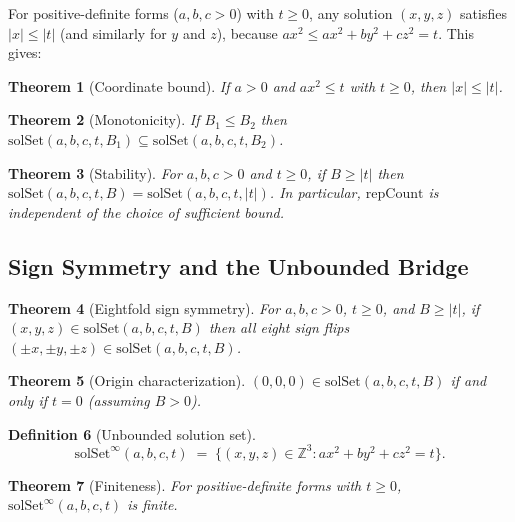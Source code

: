 \documentclass[11pt,a4paper]{article}
\newtheorem{theorem}{Theorem}[section]
\theoremstyle{definition}
\newtheorem{definition}[theorem]{Definition}
\newcommand{\Z}{\mathbb{Z}}
\newcommand{\solSet}{\mathrm{solSet}}
\newcommand{\repCount}{\mathrm{repCount}}
\newcommand{\solSetInf}{\mathrm{solSet}^{\infty}}
\begin{document}
For positive-definite forms ($a, b, c > 0$) with $t \ge 0$, any
solution $(x,y,z)$ satisfies $|x| \le |t|$ (and similarly for $y$
and $z$), because $ax^2 \le ax^2 + by^2 + cz^2 = t$.  This gives:

\begin{theorem}[Coordinate bound]\label{thm:coord-bound}
If $a > 0$ and $ax^2 \le t$ with $t \ge 0$, then $|x| \le |t|$.
\end{theorem}

\begin{theorem}[Monotonicity]\label{thm:mono}
If $B_1 \le B_2$ then
$\solSet(a,b,c,t,B_1) \subseteq \solSet(a,b,c,t,B_2)$.
\end{theorem}

\begin{theorem}[Stability]\label{thm:stable}
For $a, b, c > 0$ and $t \ge 0$, if $B \ge |t|$ then
$\solSet(a,b,c,t,B) = \solSet(a,b,c,t,|t|)$.  In particular,
$\repCount$ is independent of the choice of sufficient bound.
\end{theorem}

\subsection{Sign Symmetry and the Unbounded Bridge}\label{sec:s3}

\begin{theorem}[Eightfold sign symmetry]\label{thm:sign-sym}
For $a, b, c > 0$, $t \ge 0$, and $B \ge |t|$, if
$(x,y,z) \in \solSet(a,b,c,t,B)$ then all eight sign flips
$(\pm x, \pm y, \pm z) \in \solSet(a,b,c,t,B)$.
\end{theorem}

\begin{theorem}[Origin characterization]\label{thm:origin}
$(0,0,0) \in \solSet(a,b,c,t,B)$ if and only if $t = 0$ (assuming $B > 0$).
\end{theorem}

\begin{definition}[Unbounded solution set]
\[
  \solSetInf(a,b,c,t) \;=\;
  \bigl\{(x,y,z) \in \Z^3 : ax^2 + by^2 + cz^2 = t\bigr\}.
\]
\end{definition}

\begin{theorem}[Finiteness]\label{thm:finite}
For positive-definite forms with $t \ge 0$,
$\solSetInf(a,b,c,t)$ is finite.
\end{theorem}
\end{document}
